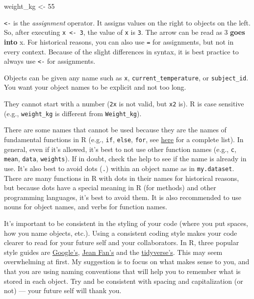\documentclass[]{book}
\newenvironment{Shaded}{\begin{snugshade}}{\end{snugshade}}
\newcommand{\DecValTok}[1]{\textcolor[rgb]{0.00,0.00,0.81}{#1}}
\newcommand{\NormalTok}[1]{#1}
\newcommand{\StringTok}[1]{\textcolor[rgb]{0.31,0.60,0.02}{#1}}
\begin{document}
\begin{Shaded}
\begin{Highlighting}[]
\NormalTok{weight_kg <-}\StringTok{ }\DecValTok{55}
\end{Highlighting}
\end{Shaded}

\texttt{\textless{}-} is the \emph{assignment} operator. It assigns values on the right to objects on the left. So, after executing \texttt{x\ \textless{}-\ 3}, the value of \texttt{x} is \texttt{3}. The arrow can be read as 3 \textbf{goes into} x. For historical reasons, you can also use \texttt{=} for assignments, but not in every context. Because of the slight differences in syntax, it is best practice to always use \texttt{\textless{}-} for assignments.

Objects can be given any name such as \texttt{x}, \texttt{current\_temperature}, or \texttt{subject\_id}. You want your object names to be explicit and not too long.

They cannot start with a number (\texttt{2x} is not valid, but \texttt{x2} is). R is case sensitive (e.g., \texttt{weight\_kg} is different from \texttt{Weight\_kg}).

There are some names that cannot be used because they are the names of fundamental functions in R (e.g., \texttt{if}, \texttt{else}, \texttt{for}, see \href{https://stat.ethz.ch/R-manual/R-devel/library/base/html/Reserved.html}{here} for a complete list). In general, even if it's allowed, it's best to not use other function names (e.g., \texttt{c}, \texttt{mean}, \texttt{data}, \texttt{weights}). If in doubt, check the help to see if the name is already in use. It's also best to avoid dots (\texttt{.}) within an object name as in \texttt{my.dataset}. There are many functions in R with dots in their names for historical reasons, but because dots have a special meaning in R (for methods) and other programming languages, it's best to avoid them. It is also recommended to use nouns for object names, and verbs for function names.

It's important to be consistent in the styling of your code (where you put spaces, how you name objects, etc.). Using a consistent coding style makes your code clearer to read for your future self and your collaborators. In R, three popular style guides are \href{https://google.github.io/styleguide/Rguide.xml}{Google's}, \href{\%22http://jef.works/R-style-guide/\%22}{Jean Fan's} and the \href{https://style.tidyverse.org/}{tidyverse's}.
This may seem overwhelming at first. My suggestion is to focus on what makes sense to you, and that you are using naming conventions that will help you to remember what is stored in each object. Try and be consistent with spacing and capitalization (or not) --- your future self will thank you.
\end{document}
